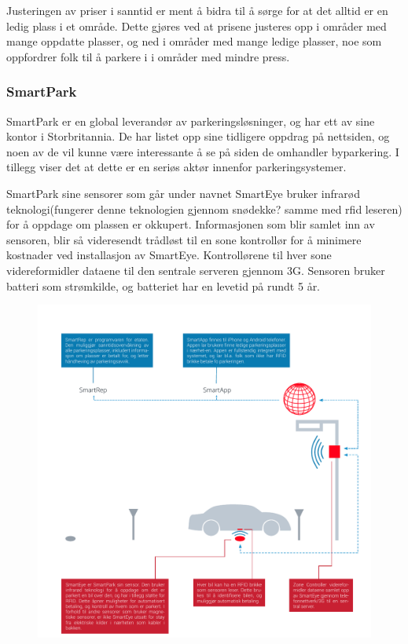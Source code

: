 \documentclass[a4paper, norsk, 12pt]{article}
\theoremstyle{remark}
\begin{document}
Justeringen av priser i sanntid er ment å bidra til å sørge for at det alltid er en ledig plass i et område. Dette gjøres ved at prisene justeres opp i områder med mange oppdatte plasser, og ned i områder med mange ledige plasser, noe som oppfordrer folk til å parkere i i områder med mindre press.


\clearpage
\subsubsection{SmartPark}
\label{ssub:smartpark}
SmartPark er en global leverandør av parkeringsløsninger, og har ett av sine kontor i Storbritannia. De har listet opp sine tidligere oppdrag på nettsiden, og noen av de vil kunne være interessante å se på siden de omhandler byparkering. I tillegg viser det at dette er en seriøs aktør innenfor parkeringsystemer. 

SmartPark sine sensorer som går under navnet SmartEye bruker infrarød teknologi(fungerer denne teknologien gjennom snødekke? samme med rfid leseren) for å oppdage om plassen er okkupert. Informasjonen som blir samlet inn av sensoren, blir så videresendt trådløst til en sone kontrollør for å minimere kostnader ved installasjon av SmartEye. Kontrollørene til hver sone videreformidler dataene til den sentrale serveren gjennom 3G. Sensoren bruker batteri som strømkilde, og batteriet har en levetid på rundt 5 år. 

\begin{figure}[H]
\centering
\centerline{\includegraphics[scale=1.0, clip=true, trim=1cm 0cm 0.5cm 1.5cm]{grafikk/smartpark.pdf}}
\end{figure}
\end{document}
